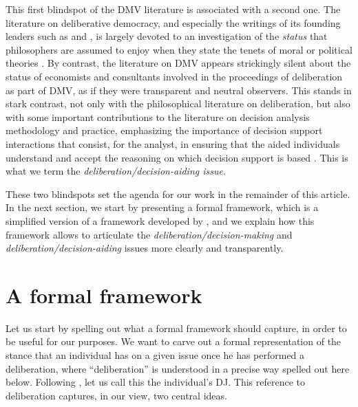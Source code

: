 \documentclass[version=3.21, pagesize, twoside=off, bibliography=totoc, DIV=calc, fontsize=12pt, a4paper, french, english]{scrartcl}
\begin{document}
This first blindspot of the DMV literature is associated with a second one. The literature on deliberative democracy, and especially the writings of its founding leaders such as \citet{rawls_political_2005} and \citet{habermas_faktizitat_1992}, is largely devoted to an investigation of the \emph{status} that philosophers are assumed to enjoy when they state the tenets of moral or political theories \citep{meinard_du_2014}. 
By contrast, the literature on DMV appears strickingly silent about the status of economists and consultants involved in the proceedings of deliberation as part of DMV, as if they were transparent and neutral observers. 
This stands in stark contrast, not only with the philosophical literature on deliberation, but also with some important contributions to the literature on decision analysis methodology and practice, emphasizing the importance of decision support interactions that consist, for the analyst, in ensuring that the aided individuals understand and accept the reasoning on which decision support is based \citep{roy_multicriteria_1996}. 
This is what we term the \emph{deliberation/decision-aiding issue}.

These two blindspots set the agenda for our work in the remainder of this article. 
In the next section, we start by presenting a formal framework, which is a simplified version of a framework developed by \citet{cailloux_formal_2018}, and we explain how this framework allows to articulate the \emph{deliberation/decision-making} and \emph{deliberation/decision-aiding} issues more clearly and transparently. 

\section{A formal framework}
Let us start by spelling out what a formal framework should capture, in order to be useful for our purposes. 
We want to carve out a formal representation of the stance that an individual has on a given issue once he has performed a deliberation, where “deliberation” is understood in a precise way spelled out here below. 
Following \citet{cailloux_formal_2018}, let us call this the individual's \ac{DJ}. 
This reference to deliberation captures, in our view, two central ideas.
\end{document}
